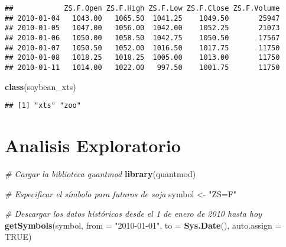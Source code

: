 \documentclass[
]{book}
\newenvironment{Shaded}{\begin{snugshade}}{\end{snugshade}}
\newcommand{\AttributeTok}[1]{\textcolor[rgb]{0.13,0.29,0.53}{#1}}
\newcommand{\CommentTok}[1]{\textcolor[rgb]{0.56,0.35,0.01}{\textit{#1}}}
\newcommand{\ConstantTok}[1]{\textcolor[rgb]{0.56,0.35,0.01}{#1}}
\newcommand{\DecValTok}[1]{\textcolor[rgb]{0.00,0.00,0.81}{#1}}
\newcommand{\FunctionTok}[1]{\textcolor[rgb]{0.13,0.29,0.53}{\textbf{#1}}}
\newcommand{\NormalTok}[1]{#1}
\newcommand{\OtherTok}[1]{\textcolor[rgb]{0.56,0.35,0.01}{#1}}
\newcommand{\SpecialCharTok}[1]{\textcolor[rgb]{0.81,0.36,0.00}{\textbf{#1}}}
\newcommand{\StringTok}[1]{\textcolor[rgb]{0.31,0.60,0.02}{#1}}
\begin{document}
\begin{Shaded}
\end{Shaded}

\begin{verbatim}
##            ZS.F.Open ZS.F.High ZS.F.Low ZS.F.Close ZS.F.Volume
## 2010-01-04   1043.00   1065.50  1041.25    1049.50       25947
## 2010-01-05   1047.00   1056.00  1042.00    1052.25       21073
## 2010-01-06   1050.00   1058.50  1042.75    1050.50       17567
## 2010-01-07   1050.50   1052.00  1016.50    1017.75       11750
## 2010-01-08   1018.25   1018.25  1005.00    1013.00       11750
## 2010-01-11   1014.00   1022.00   997.50    1001.75       11750
\end{verbatim}

\begin{Shaded}
\begin{Highlighting}[]
\FunctionTok{class}\NormalTok{(soybean\_xts)}
\end{Highlighting}
\end{Shaded}

\begin{verbatim}
## [1] "xts" "zoo"
\end{verbatim}

\hypertarget{analisis-exploratorio}{%
\chapter{Analisis Exploratorio}\label{analisis-exploratorio}}

\begin{Shaded}
\begin{Highlighting}[]
\CommentTok{\# Cargar la biblioteca quantmod}
\FunctionTok{library}\NormalTok{(quantmod)}

\CommentTok{\# Especificar el símbolo para futuros de soja}
\NormalTok{symbol }\OtherTok{\textless{}{-}} \StringTok{"ZS=F"}

\CommentTok{\# Descargar los datos históricos desde el 1 de enero de 2010 hasta hoy}
\FunctionTok{getSymbols}\NormalTok{(symbol, }\AttributeTok{from =} \StringTok{"2010{-}01{-}01"}\NormalTok{, }\AttributeTok{to =} \FunctionTok{Sys.Date}\NormalTok{(), }\AttributeTok{auto.assign =} \ConstantTok{TRUE}\NormalTok{)}
\end{Highlighting}
\end{Shaded}
\end{document}
